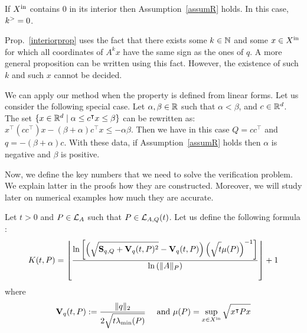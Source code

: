 \documentclass[10pt]{llncs}
\begin{document}
\begin{prop}
\label{interiorprop}
If $X^\mathrm{in}$ contains $0$ in its interior then Assumption~\ref{assumR} holds. In this case, $k^{>}=0$.
\end{prop}

%
%

Prop.~\ref{interiorprop} uses the fact that there exists some $k\in\mathbb{N}$ and some $x\in X^\mathrm{in}$ for which all coordinates of $A^k x$ have the same sign as the ones of $q$. A more general proposition can be written using this fact. However, the existence of such $k$ and such $x$ cannot be decided.     
 
\begin{remark}
\label{remarklinear}
We can apply our method when the property is defined from linear forms. 
Let us consider the following special case. Let $\alpha,\beta\in\mathbb R$ such that $\alpha<\beta$, and $c\in\mathbb R^d$. The set $\{x\in\mathbb R^d \mid \alpha \leq c^\intercal x\leq \beta\}$ can be rewritten as:
$x^\intercal (c c^\intercal) x-(\beta+\alpha) c^\intercal x \leq -\alpha \beta$. Then we have in this case $Q=c c^\intercal$ and $q= -(\beta+\alpha) c$. With these data, if Assumption~\ref{assumR} holds then $\alpha$ is negative and $\beta$ is positive. 
\end{remark}

Now, we define the key numbers that we need to solve the verification problem. We explain latter in the proofs how they are constructed. Moreover, we will study later on numerical examples how much they are accurate.  


Let $t>0$ and $P\in\mathcal{L}_{A}$ such that $P\in \mathcal{L}_{A,Q}(t)$. Let us define the following formula :
\begin{equation}
\label{intgfond}
K(t,P)=\left\lfloor \dfrac{\ln\left[\left(\sqrt{\strut \mathbf{S}_{q,Q}+\mathbf{V}_{q}(t,P)^2}-\mathbf{V}_{q}(t,P)\right)\left(\sqrt{\strut t}\mu(P)\right)^{-1}\right]}{\ln\left(\| A\|_P\right)}\right\rfloor+1
\end{equation}
where 
\[
\mathbf{V}_{q}(t,P):=\dfrac{\| q\|_2 }{2\sqrt{\strut t\lambda_{\operatorname{min}}(P)}}\quad \text{ and } \mu(P)=\sup_{x\in X^\mathrm{in}} \sqrt{\strut x^\intercal P x}
\]
\end{document}
